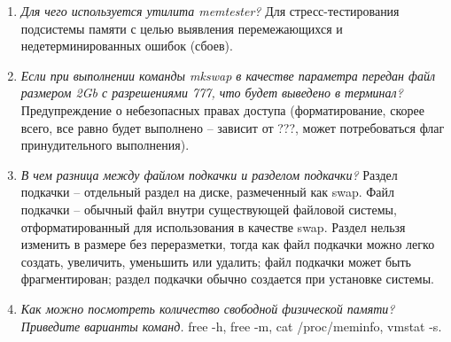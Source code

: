\begin{enumerate}
	\item \textit{Для чего используется утилита memtester?}\newline 
	Для стресс-тестирования подсистемы памяти с целью выявления перемежающихся и недетерминированных ошибок (сбоев). 
	\item \textit{Если при выполнении команды mkswap в качестве параметра передан файл размером 2Gb с разрешениями 777, что будет выведено в терминал?}\newline 
	Предупреждение о небезопасных правах доступа (форматирование, скорее всего, все равно будет выполнено -- зависит от ???, может потребоваться флаг принудительного выполнения). 
	\item \textit{В чем разница между файлом подкачки и разделом подкачки?}\newline 
	Раздел подкачки -- отдельный раздел на диске, размеченный как swap.
	Файл подкачки -- обычный файл внутри существующей файловой системы, отформатированный для использования в качестве swap. 
	Раздел нельзя изменить в размере без переразметки, тогда как файл подкачки можно легко создать, увеличить, уменьшить или удалить; файл подкачки может быть фрагментирован; раздел подкачки обычно создается при установке системы.
	\item \textit{Как можно посмотреть количество свободной физической памяти? Приведите варианты команд.}\newline 
	free -h, free -m, cat /proc/meminfo, vmstat -s.
\end{enumerate}
